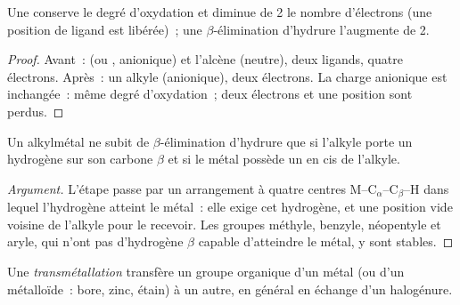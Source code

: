\begin{proposition}\label{prop:b2:catalytic-cycles:insertion}
Une  conserve le degré d'oxydation et diminue de 2 le nombre d'électrons
(une position de ligand est libérée)~; une $\beta$-élimination d'hydrure l'augmente de 2.
\end{proposition}

\begin{proof}
Avant~:  (ou , anionique) et l'alcène (neutre), deux ligands, quatre électrons.
Après~: un alkyle (anionique), deux électrons. La charge anionique est inchangée~: même
degré d'oxydation~; deux électrons et une position sont perdus.
\end{proof}

\begin{proposition}\label{prop:b2:catalytic-cycles:beta-h}
Un alkylmétal ne subit de $\beta$-élimination d'hydrure que si l'alkyle porte un hydrogène sur
son carbone $\beta$ et si le métal possède un  en cis de l'alkyle.
\end{proposition}

\begin{proof}[Argument]
L'étape passe par un arrangement à quatre centres M--C$_\alpha$--C$_\beta$--H dans lequel
l'hydrogène atteint le métal~: elle exige cet hydrogène, et une position vide voisine de l'alkyle
pour le recevoir. Les groupes méthyle, benzyle, néopentyle et aryle, qui n'ont pas d'hydrogène $\beta$
capable d'atteindre le métal, y sont stables.
\end{proof}

\begin{definition}[Transmétallation]\label{def:b2:catalytic-cycles:transmetalation}
Une \emph{transmétallation} transfère un groupe organique d'un métal
(ou d'un métalloïde~: bore, zinc, étain) à un autre, en général en échange d'un halogénure.
\end{definition}

